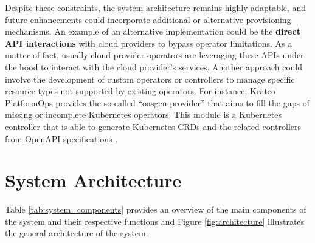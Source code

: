 Despite these constraints, the system architecture remains highly adaptable, and future enhancements could incorporate additional or alternative provisioning mechanisms. 
An example of an alternative implementation could be the \textbf{direct API interactions} with cloud providers to bypass operator limitations. As a matter of fact, usually cloud provider operators are leveraging these APIs under the hood to interact with the cloud provider’s services.
Another approach could involve the development of custom operators or controllers to manage specific resource types not supported by existing operators.
For instance, Krateo PlatformOps provides the so-called ``oasgen-provider'' that aims to fill the gaps of missing or incomplete Kubernetes operators. This module is a Kubernetes controller that is able to generate Kubernetes CRDs and the related controllers from OpenAPI specifications \cite{krateo_oasgen_provider}. 

\section{System Architecture}
\label{sec:system_architecture}

Table \ref{tab:system_components} provides an overview of the main components of the system and their respective functions and Figure \ref{fig:architecture} illustrates the general architecture of the system.

